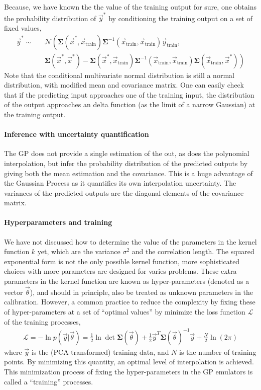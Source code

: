 Because, we have known the the value of the training output for sure, one obtains the probability distribution of $\vec{y}^*$ by conditioning the training output on a set of fixed values,
\begin{eqnarray}
\vec{y}^* \sim &&\mathcal{N}\left(
\mathbf{\Sigma}(\vec{x}^*, \vec{x}_{\textrm{train}} )
\mathbf{\Sigma}^{-1}(\vec{x}_{\textrm{train}}, \vec{x}_{\textrm{train}} )\vec{y}_{\textrm{train}},\right.\\\nonumber
&&\left.
\mathbf{\Sigma}(\vec{x}^*, \vec{x}^*) - 
\mathbf{\Sigma}(\vec{x}^*, \vec{x}_{\textrm{train}} )
\mathbf{\Sigma}^{-1}(\vec{x}_{\textrm{train}}, \vec{x}_{\textrm{train}} )
\mathbf{\Sigma}(\vec{x}_{\textrm{train}},\vec{x}^*)
\right)
\end{eqnarray}
Note that the conditional multivariate normal distribution is still a normal distribution, with modified mean and covariance matrix.
One can easily check that if the predicting input approaches one of the training input, the distribution of the output approaches an delta function (as the limit of a narrow Gaussian) at the training output.

\paragraph{Inference with uncertainty quantification} The GP does not provide a single estimation of the out, as does the polynomial interpolation, but infer the probability distribution of the predicted outputs by giving both the mean estimation and the covariance.
This is a huge advantage of the Gaussian Process as it quantifies its own interpolation uncertainty.
The variances of the predicted outputs are the diagonal elements of the covariance matrix.

\paragraph{Hyperparameters and training} We have not discussed how to determine the value of the parameters in the kernel function $k$ yet, which are the variance $\sigma^2$ and the correlation length. 
The squared exponential form is not the only possible kernel function, more sophisticated choices with more parameters are designed for varies problems.
These extra parameters in the kernel function are known as hyper-parameters (denoted as a vector $\vec{\theta}$), and should in principle, also be treated as unknown parameters in the calibration.
However, a common practice to reduce the complexity by fixing these of hyper-parameters at a set of ``optimal values'' by minimize the loss function $\mathcal{L}$ of the training processes,
\begin{eqnarray}
\mathcal{L} = -\ln p(\vec{y}|\vec{\theta}) = \frac{1}{2}\ln \det \mathbf{\Sigma}(\vec{\theta})  + \frac{1}{2}\vec{y}^T \mathbf{\Sigma}(\vec{\theta})^{-1} \vec{y} + \frac{N}{2}\ln(2\pi)
\end{eqnarray}
where $\vec{y}$ is the (PCA transformed) training data, and $N$ is the number of training points.
By minimizing this quantity, an optimal level of interpolation is achieved.
This minimization process of fixing the hyper-parameters in the GP emulators is called a ``training'' processes.

